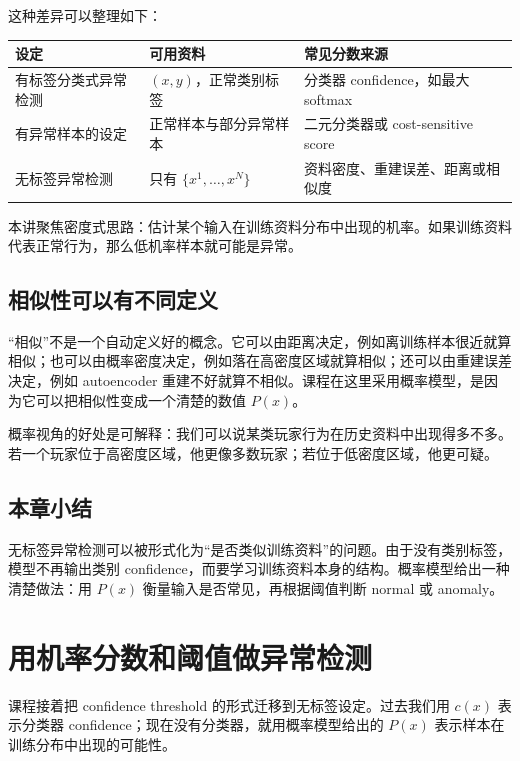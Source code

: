 \documentclass[a4paper]{article}
\begin{document}
这种差异可以整理如下：
\begin{center}
\begin{tabular}{L{3.2cm} L{4.8cm} L{4.8cm}}
\toprule
设定 & 可用资料 & 常见分数来源 \\
\midrule
有标签分类式异常检测 & $(x,y)$，正常类别标签 & 分类器 confidence，如最大 softmax \\
有异常样本的设定 & 正常样本与部分异常样本 & 二元分类器或 cost-sensitive score \\
无标签异常检测 & 只有 $\{x^1,\ldots,x^N\}$ & 资料密度、重建误差、距离或相似度 \\
\bottomrule
\end{tabular}
\end{center}

本讲聚焦密度式思路：估计某个输入在训练资料分布中出现的机率。如果训练资料代表正常行为，那么低机率样本就可能是异常。

\subsection{相似性可以有不同定义}

“相似”不是一个自动定义好的概念。它可以由距离决定，例如离训练样本很近就算相似；也可以由概率密度决定，例如落在高密度区域就算相似；还可以由重建误差决定，例如 autoencoder 重建不好就算不相似。课程在这里采用概率模型，是因为它可以把相似性变成一个清楚的数值 $P(x)$。

概率视角的好处是可解释：我们可以说某类玩家行为在历史资料中出现得多不多。若一个玩家位于高密度区域，他更像多数玩家；若位于低密度区域，他更可疑。

\subsection{本章小结}

无标签异常检测可以被形式化为“是否类似训练资料”的问题。由于没有类别标签，模型不再输出类别 confidence，而要学习训练资料本身的结构。概率模型给出一种清楚做法：用 $P(x)$ 衡量输入是否常见，再根据阈值判断 normal 或 anomaly。

\section{用机率分数和阈值做异常检测}

课程接着把 confidence threshold 的形式迁移到无标签设定。过去我们用 $c(x)$ 表示分类器 confidence；现在没有分类器，就用概率模型给出的 $P(x)$ 表示样本在训练分布中出现的可能性。
\end{document}
